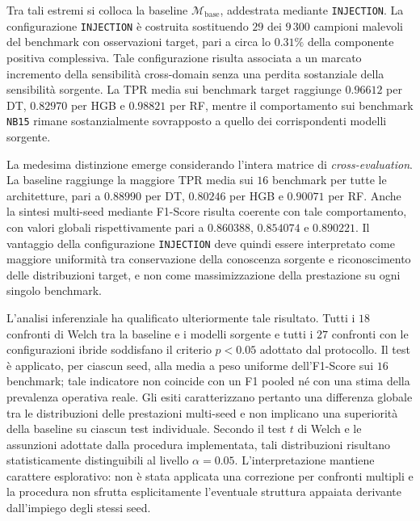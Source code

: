 Tra tali estremi si colloca la baseline $\mathcal{M}_{\mathrm{base}}$, addestrata mediante \texttt{INJECTION}. 
La configurazione \texttt{INJECTION} è costruita sostituendo $29$ dei $9\,300$ campioni malevoli del benchmark con osservazioni target, pari a circa lo $0.31\%$ della componente positiva complessiva. 
Tale configurazione risulta associata a un marcato incremento della sensibilità cross-domain senza una perdita sostanziale della sensibilità sorgente.
La TPR media sui benchmark target raggiunge $0.96612$ per DT, $0.82970$ per HGB e $0.98821$ per RF, mentre il comportamento sui benchmark \texttt{NB15} rimane sostanzialmente sovrapposto a quello dei corrispondenti modelli sorgente.

La medesima distinzione emerge considerando l'intera matrice di \textit{cross-evaluation}. 
La baseline raggiunge la maggiore TPR media sui $16$ benchmark per tutte le architetture, pari a $0.88990$ per DT, $0.80246$ per HGB e $0.90071$ per RF. 
Anche la sintesi multi-seed mediante F1-Score risulta coerente con tale comportamento, con valori globali rispettivamente pari a $0.860388$, $0.854074$ e $0.890221$. 
Il vantaggio della configurazione \texttt{INJECTION} deve quindi essere interpretato come maggiore uniformità tra conservazione della conoscenza sorgente e riconoscimento delle distribuzioni target, e non come massimizzazione della prestazione su ogni singolo benchmark.

L'analisi inferenziale ha qualificato ulteriormente tale risultato. 
Tutti i $18$ confronti di Welch tra la baseline e i modelli sorgente e tutti i $27$ confronti con le configurazioni ibride soddisfano il criterio $p<0.05$ adottato dal protocollo. 
Il test è applicato, per ciascun seed, alla media a peso uniforme dell'F1-Score sui $16$ benchmark; tale indicatore non coincide con un F1 pooled né con una stima della prevalenza operativa reale. Gli esiti caratterizzano pertanto una differenza globale tra le distribuzioni delle prestazioni multi-seed e non implicano una superiorità della baseline su ciascun test individuale. 
Secondo il test $t$ di Welch e le assunzioni adottate dalla procedura implementata, tali distribuzioni risultano statisticamente distinguibili al livello $\alpha=0.05$. 
L'interpretazione mantiene carattere esplorativo: non è stata applicata una correzione per confronti multipli e la procedura non sfrutta esplicitamente l'eventuale struttura appaiata derivante dall'impiego degli stessi seed.

